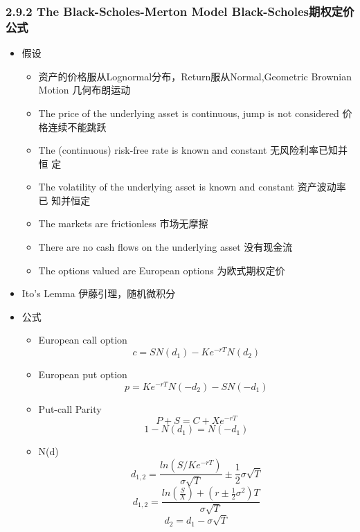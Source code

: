\documentclass[a4paper,6pt,twoside,openany]{article}
\begin{document}
\subsubsection*{2.9.2 The Black-Scholes-Merton Model Black-Scholes期权定价公式}
\begin{itemize}
\item 假设
  \begin{itemize}
  \item 资产的价格服从Lognormal分布，Return服从Normal,Geometric Brownian Motion
    几何布朗运动
  \item The price of the underlying asset is continuous, jump is not considered
    价格连续不能跳跃
  \item The (continuous) risk-free rate is known and constant 无风险利率已知并恒
    定
  \item The volatility of the underlying asset is known and constant 资产波动率已
    知并恒定
  \item The markets are frictionless 市场无摩擦
  \item There are no cash flows on the underlying asset 没有现金流
  \item The options valued are European options 为欧式期权定价
  \end{itemize}
\item Ito's Lemma 伊藤引理，随机微积分
\item 公式
  \begin{itemize}
  \item European call option $$c=SN(d_{1}) - Ke^{-rT}N(d_{2})$$
  \item European put option $$p= Ke^{-rT}N(-d_{2}) - SN(-d_{1})$$
  \item Put-call Parity $$P+ S = C+ Xe^{-rT}$$ $$1 - N(d_{1}) = N(-d_{1})$$
  \item N(d) $$d_{1,2} = \frac{ln(S/Ke^{-rT})}{\sigma \sqrt{T}} \pm
    \frac{1}{2}\sigma \sqrt{T}$$
    $$d_{1,2}= \frac{ln(\frac{S}{X}) +(r \pm \frac{1}{2}\sigma^{2})T}{\sigma \sqrt T}$$
    $$d_{2} = d_{1} - \sigma \sqrt{T}$$
             

\end{itemize}
\end{itemize}
\end{document}
